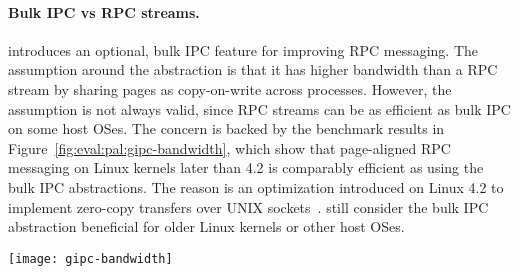 \paragraph{Bulk IPC vs RPC streams.}
\Thehostabi{} introduces an optional, bulk IPC feature for improving RPC messaging.
The assumption around the
abstraction
is that it has higher bandwidth
than a RPC stream
by sharing pages as copy-on-write across processes.
However,
the assumption is not always valid, since RPC streams
can be as efficient as bulk IPC on some host OSes.
The concern is backed by the benchmark results in Figure~\ref{fig:eval:pal:gipc-bandwidth},
which show that
page-aligned RPC messaging on Linux kernels later than 4.2
is comparably efficient
as using the bulk IPC abstractions.
The reason is an optimization introduced on Linux 4.2
to implement zero-copy transfers
over UNIX sockets~\cite{linux4.2-unix}.
\graphene{} still consider the bulk IPC abstraction
beneficial for older Linux kernels
or other host OSes. 



\begin{figure*}[t!]
\centering
\footnotesize
\texttt{[image: gipc-bandwidth]}
\caption{Bandwidth of sending large messages over (a) RPC streams and (b) Bulk IPC channels. The messages are sent in different sizes (1MB to 256MB), and either aligned or unaligned with the page boundary.
Higher is better. Both abstractions are benchmarked on Linux kernel 3.19 and 4.10 as the hosts. The impact of the \seccomp{} filter or reference monitor is marginal (less than 1\%).}
\label{fig:eval:pal:gipc-bandwidth}
\end{figure*}


 





